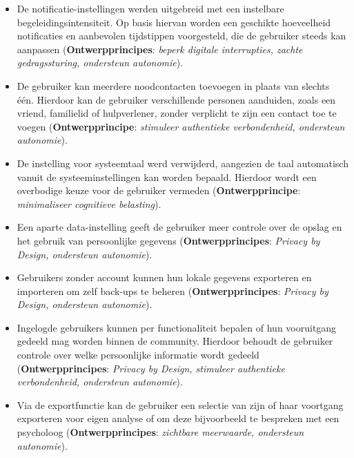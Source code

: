 \vspace{1em}

{\small
    \begin{itemize}
        \item De notificatie-instellingen werden uitgebreid met een instelbare begeleidingsintensiteit. Op basis hiervan worden een geschikte hoeveelheid notificaties en aanbevolen tijdstippen voorgesteld, die de gebruiker steeds kan aanpassen (\textbf{Ontwerpprincipes}: \textit{beperk digitale interrupties, zachte gedragssturing, ondersteun autonomie}).
        
        \item De gebruiker kan meerdere noodcontacten toevoegen in plaats van slechts één. Hierdoor kan de gebruiker verschillende personen aanduiden, zoals een vriend, familielid of hulpverlener, zonder verplicht te zijn een contact toe te voegen (\textbf{Ontwerpprincipe}: \textit{stimuleer authentieke verbondenheid, ondersteun autonomie}).
        
        \item De instelling voor systeemtaal werd verwijderd, aangezien de taal automatisch vanuit de systeeminstellingen kan worden bepaald. Hierdoor wordt een overbodige keuze voor de gebruiker vermeden (\textbf{Ontwerpprincipe}: \textit{minimaliseer cognitieve belasting}).
        
        \item Een aparte data-instelling geeft de gebruiker meer controle over de opslag en het gebruik van persoonlijke gegevens (\textbf{Ontwerpprincipes}: \textit{Privacy by Design, ondersteun autonomie}).
        
        \item Gebruikers zonder account kunnen hun lokale gegevens exporteren en importeren om zelf back-ups te beheren (\textbf{Ontwerpprincipes}: \textit{Privacy by Design, ondersteun autonomie}).
        
        \item Ingelogde gebruikers kunnen per functionaliteit bepalen of hun vooruitgang gedeeld mag worden binnen de community. Hierdoor behoudt de gebruiker controle over welke persoonlijke informatie wordt gedeeld (\textbf{Ontwerpprincipes}: \textit{Privacy by Design, stimuleer authentieke verbondenheid, ondersteun autonomie}).
        
        \item Via de exportfunctie kan de gebruiker een selectie van zijn of haar voortgang exporteren voor eigen analyse of om deze bijvoorbeeld te bespreken met een psycholoog (\textbf{Ontwerpprincipes}: \textit{zichtbare meerwaarde, ondersteun autonomie}).
    \end{itemize}
}

